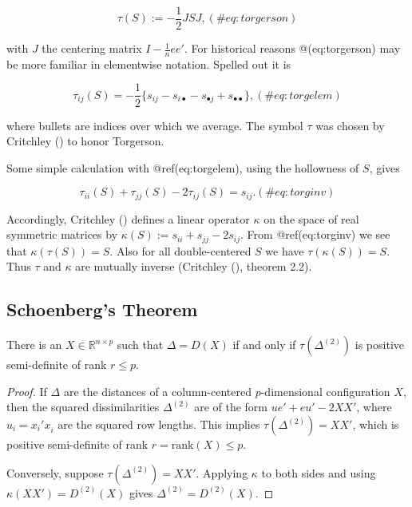 \documentclass[
  12pt,
  letterpaper,
  DIV=11,
  numbers=noendperiod]{scrreprt}
\theoremstyle{remark}
\begin{document}
\begin{equation}
\tau(S):=-\frac12 JSJ,
(\#eq:torgerson)
\end{equation}

with \(J\) the centering matrix \(I-\frac{1}{n}ee'\). For historical
reasons @(eq:torgerson) may be more familiar in elementwise notation.
Spelled out it is

\begin{equation}
\tau_{ij}(S)=-\frac12\{s_{ij}-s_{i\bullet}-s_{\bullet j}+s_{\bullet\bullet}\},
(\#eq:torgelem)
\end{equation}

where bullets are indices over which we average. The symbol \(\tau\) was
chosen by Critchley () to honor
Torgerson.

Some simple calculation with @ref(eq:torgelem), using the hollowness of
\(S\), gives

\begin{equation}
\tau_{ii}(S)+\tau_{jj}(S)-2\tau_{ij}(S)=s_{ij}.
(\#eq:torginv)
\end{equation}

Accordingly, Critchley () defines a
linear operator \(\kappa\) on the space of real symmetric matrices by
\(\kappa(S):=s_{ii}+s_{jj}-2s_{ij}\). From @ref(eq:torginv) we see that
\(\kappa(\tau(S))=S\). Also for all double-centered \(S\) we have
\(\tau(\kappa(S))=S\). Thus \(\tau\) and \(\kappa\) are mutually inverse
(Critchley (), theorem 2.2).

\subsection{Schoenberg's Theorem}\label{schoenbergs-theorem}

\label{schoenberg}
There is an \(X\in\mathbb{R}^{n\times p}\) such that \(\Delta=D(X)\) if
and only if \(\tau(\Delta^{(2)})\) is positive semi-definite of rank
\(r\leq p\).

\begin{proof}
If \(\Delta\) are the distances of a column-centered \(p\)-dimensional
configuration \(X\), then the squared dissimilarities \(\Delta^{(2)}\)
are of the form \(ue'+eu'-2XX'\), where \(u_i=x_i'x_i^{\ }\) are the
squared row lengths. This implies \(\tau(\Delta^{(2)})=XX'\), which is
positive semi-definite of rank \(r=\text{rank}(X)\leq p\).

Conversely, suppose \(\tau(\Delta^{(2)})=XX'\). Applying \(\kappa\) to
both sides and using \(\kappa(XX')=D^{(2)}(X)\) gives
\(\Delta^{(2)}=D^{(2)}(X)\).
\end{proof}
\end{document}
